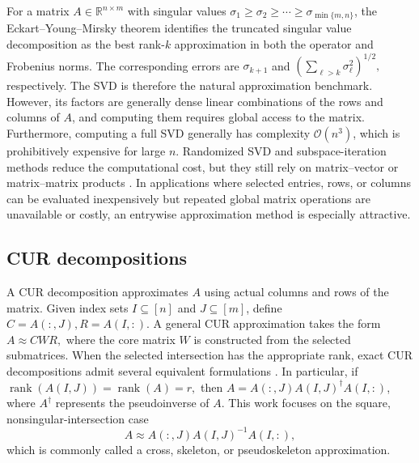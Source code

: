\documentclass[11pt, preprint]{article}
\newcommand{\rank}{\operatorname{rank}}
\newcommand{\R}{\mathbb{R}}
\renewcommand{\O}{\mathcal{O}}
\begin{document}
For a matrix $A\in\R^{n\times m}$ with singular values
$\sigma_1\geq \sigma_2\geq\cdots\geq \sigma_{\min\{m,n\}}$, the Eckart--Young--Mirsky theorem identifies
the truncated singular value decomposition as the best rank-$k$ approximation
in both the operator and Frobenius norms. The corresponding errors are
$\sigma_{k+1}$ and
\(
    \left(\sum_{\ell>k}\sigma_\ell^2\right)^{1/2},
\)
respectively. The SVD is therefore the natural approximation benchmark.
However, its factors are generally dense linear combinations of the rows and
columns of $A$, and computing them requires global access to the matrix. Furthermore, computing a full SVD generally has complexity $\O(n^3)$, which is prohibitively expensive for large $n$. 
Randomized SVD and subspace-iteration methods reduce the computational cost,
but they still rely on matrix--vector or matrix--matrix products
\cite{Tropp_RandomizedAlgorithmsLowrank2023}. In applications where selected
entries, rows, or columns can be evaluated inexpensively but repeated global
matrix operations are unavailable or costly, an entrywise approximation
method is especially attractive.

\subsection{CUR decompositions}

A CUR decomposition approximates $A$ using actual columns and rows of the
matrix. Given index sets $I\subseteq[n]$ and $J\subseteq[m]$, define
\(
    C=A(:,J),R=A(I,:).
\)
A general CUR approximation takes the form
\(
    A\approx C WR,
\)
where the core matrix $W$ is constructed from the selected submatrices. When the selected intersection has the appropriate rank, exact CUR decompositions admit several equivalent formulations \cite{Hamm_PerspectivesCUR2020}. In particular, if
\( \rank(A(I,J))=\rank(A)=r,\)
then
\(
    A=A(:,J)A(I,J)^\dagger A(I,:)
\), where $A^\dagger$ represents the pseudoinverse of $A$. 
This work focuses on the square, nonsingular-intersection case
\[
    A\approx A(:,J)A(I,J)^{-1}A(I,:),
\]
which is commonly called a cross, skeleton, or pseudoskeleton approximation.
\end{document}
